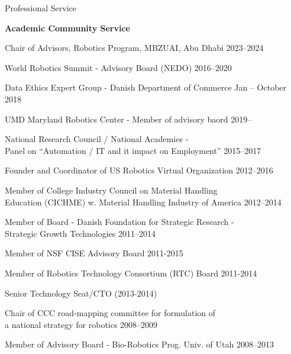 \documentclass{article}
\newenvironment{sublist}{%
  \begin{list}{}{%
      \setlength{\itemsep}{0em}\setlength{\parsep}{0em}%
      \setlength{\topsep}{0em}\setlength{\parskip}{0em}%
    }%
}%
{ \end{list} }
\begin{document}
\begin{cv}


\begin{cvlist}{Professional Service}%
\item {\bf Academic Community Service}
  \begin{itemize}
    \item Chair of Advisors, Robotics Program, MBZUAI, Abu Dhabi
          \cftdotfill{\cftdotsep} 2023--2024
  \item World Robotics Summit - Advisory Board (NEDO)
    \cftdotfill{\cftdotsep} 2016--2020
  \item Data Ethics Expert Group - Danish Department of Commerce
    \cftdotfill{\cftdotsep} Jan -- October 2018
  \item UMD Maryland Robotics Center - Member of advisory baord \cftdotfill{\cftdotsep} 2019--
    \item National Research Council / National Academies -\\ Panel on
    ``Automation / IT and it impact on Employment''
    \cftdotfill{\cftdotsep} 2015--2017
  \item Founder and Coordinator of US Robotics Virtual Organization
    \cftdotfill{\cftdotsep} 2012--2016
  \item Member of College Industry Council on Material Handling\\
    Education (CICHME) w. Material Handling Industry of America
    \cftdotfill{\cftdotsep} 2012--2014
  \item Member of Board - Danish Foundation for Strategic Research -\\
    Strategic Growth Technologies \cftdotfill{\cftdotsep} 2011--2014
  \item Member of NSF CISE Advisory Board \cftdotfill{\cftdotsep} 2011-2015
  \item Member of Robotics Technology Consortium (RTC) Board \cftdotfill{\cftdotsep} 2011-2014
  \begin{sublist}
    \item Senior Technology Seat/CTO (2013-2014)
  \end{sublist}
  \item Chair of CCC road-mapping committee for formulation of \\
    a national strategy for robotics \cftdotfill{\cftdotsep}
    2008--2009
  \item Member of Advisory Board - Bio-Robotics Prog. Univ. of Utah  \cftdotfill{\cftdotsep} 2008--2013

\end{itemize}
\end{cvlist}
\end{cv}
\end{document}
